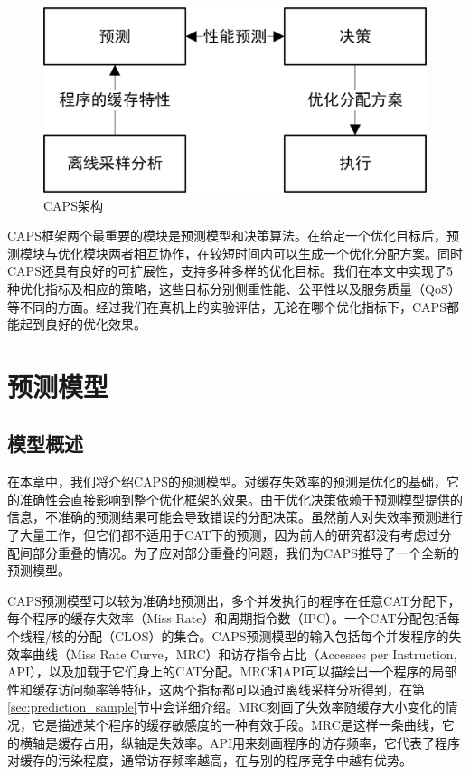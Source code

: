 \begin{figure}[htbp] 
    \centering
    \includegraphics[width=0.6\linewidth]{figures/caps_overview.png}
    \caption{CAPS架构}
    \label{fig:caps_overview}
\end{figure}

CAPS框架两个最重要的模块是预测模型和决策算法。在给定一个优化目标后，预测模块与优化模块两者相互协作，在较短时间内可以生成一个优化分配方案。同时CAPS还具有良好的可扩展性，支持多种多样的优化目标。我们在本文中实现了5种优化指标及相应的策略，这些目标分别侧重性能、公平性以及服务质量（QoS）等不同的方面。经过我们在真机上的实验评估，无论在哪个优化指标下，CAPS都能起到良好的优化效果。

\section{预测模型} \label{sec:prediction}
\subsection{模型概述}
在本章中，我们将介绍CAPS的预测模型。对缓存失效率的预测是优化的基础，它的准确性会直接影响到整个优化框架的效果。由于优化决策依赖于预测模型提供的信息，不准确的预测结果可能会导致错误的分配决策。虽然前人对失效率预测进行了大量工作，但它们都不适用于CAT下的预测，因为前人的研究都没有考虑过分配间部分重叠的情况。为了应对部分重叠的问题，我们为CAPS推导了一个全新的预测模型。

CAPS预测模型可以较为准确地预测出，多个并发执行的程序在任意CAT分配下，每个程序的缓存失效率（Miss Rate）和周期指令数（IPC）。一个CAT分配包括每个线程/核的分配（CLOS）的集合。CAPS预测模型的输入包括每个并发程序的失效率曲线（Miss Rate Curve，MRC）和访存指令占比（Accesses per Instruction, API），以及加载于它们身上的CAT分配。MRC和API可以描绘出一个程序的局部性和缓存访问频率等特征，这两个指标都可以通过离线采样分析得到，在第\ref{sec:prediction_sample}节中会详细介绍。MRC刻画了失效率随缓存大小变化的情况，它是描述某个程序的缓存敏感度的一种有效手段。MRC是这样一条曲线，它的横轴是缓存占用，纵轴是失效率。API用来刻画程序的访存频率，它代表了程序对缓存的污染程度，通常访存频率越高，在与别的程序竞争中越有优势。

